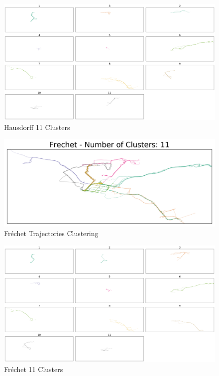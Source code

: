 \documentclass[a4paper, 12pt]{article}
\begin{document}
\begin{figure}[htbp!]
    \centering
    \includegraphics[width=1\textwidth]{hausdorff_11_clusters.png}
    \caption{Hausdorff 11 Clusters}
    \label{fig26}
\end{figure}

\begin{figure}[htbp!]
    \centering
    \includegraphics[width=1\textwidth]{frechet_trajectory_clustering.png}
    \caption{Fréchet Trajectories Clustering}
    \label{fig27}
\end{figure}

\begin{figure}[htbp!]
    \centering
    \includegraphics[width=1\textwidth]{frechet_11_clusters.png}
    \caption{Fréchet 11 Clusters}
    \label{fig28}
\end{figure}
\end{document}
